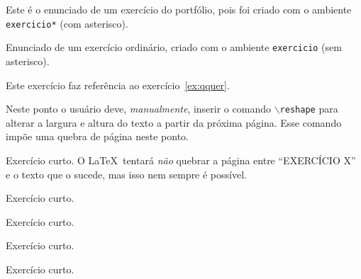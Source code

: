 \documentclass[a4paper]{article}
\begin{document}
\maketitle
 
\begin{exercicio*}
  Este é o enunciado de um exercício do portfólio, pois foi criado com o ambiente \texttt{exercicio*} (com asterisco).
\end{exercicio*}

\begin{exercicio}
  \label{ex:qquer}
  Enunciado de um exercício ordinário, criado com o ambiente \texttt{exercicio} (sem asterisco).
\end{exercicio}

\begin{exercicio}
  Este exercício faz referência ao exercício~\ref{ex:qquer}.
\end{exercicio}

\begin{exercicio}
 \lipsum[1-2]
 \begingroup
  \color{red}Neste ponto o usuário deve, \emph{manualmente}, inserir o comando \texttt{$\backslash$reshape} para alterar a largura e altura do texto a partir da próxima página.
  Esse comando impõe uma quebra de página neste ponto.
 \endgroup
 \reshape
 \lipsum[4-16]
\end{exercicio}

\begin{exercicio}
  Exercício curto.
  O \LaTeX\ tentará \emph{não} quebrar a página entre ``EXERCÍCIO X'' e o texto que o sucede, mas isso nem sempre é possível.
\end{exercicio}

\begin{exercicio}
  Exercício curto.
\end{exercicio}

\begin{exercicio}
  Exercício curto.
\end{exercicio}

\begin{exercicio}
  Exercício curto.
\end{exercicio}

\begin{exercicio}
  Exercício curto.
\end{exercicio}
\end{document}
